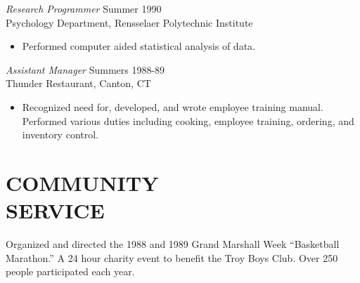 \documentclass[line,margin]{res}
\begin{document}
\begin{resume}
                {\sl Research Programmer} \hfill            Summer 1990 \\
                Psychology Department, Rensselaer Polytechnic
                Institute
                 \begin{itemize}  \itemsep -2pt %
                 \item Performed computer aided statistical analysis
                    of data.
                 \end{itemize}
                {\sl Assistant Manager} \hfill        Summers 1988-89 \\
                Thunder Restaurant, Canton, CT
                  \begin{itemize}
                   \item Recognized need for, developed, and wrote
                    employee training manual. Performed various
                    duties including cooking, employee training,
                    ordering, and inventory control.
                   \end{itemize}

\section{COMMUNITY \\ SERVICE}  Organized and directed the 1988 and 1989 Grand
                 Marshall Week \newline ``Basketball Marathon.'' A 24 hour
                charity event to benefit the Troy Boys Club. Over
                250 people participated each year.


\end{resume}
\end{document}
